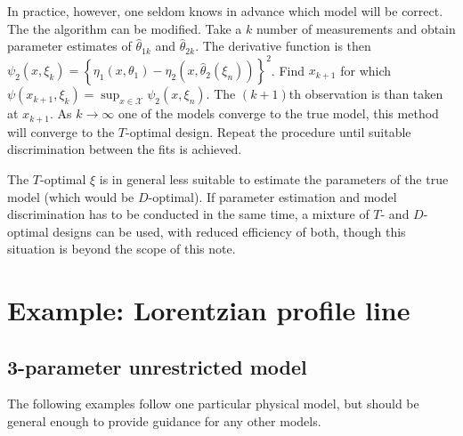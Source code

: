 \documentclass[12pt]{iopart}
\begin{document}
In practice, however, one seldom knows in advance which model will be correct. The the algorithm can be modified. Take a $k$ number of measurements and obtain parameter estimates of $\hat \theta_{1k}$ and $\hat \theta_{2k}$. The derivative function is then $\psi_2(x, \xi_k) = \left\{\eta_1(x, \theta_1) - \eta_2(x, \hat \theta_2(\xi_n))\right\}^2$. Find $x_{k+1}$ for which $\psi(x_{k+1}, \xi_k) = \sup_{x \in \mathcal{X}}\psi_2(x, \xi_n)$. The $(k+1)$th observation is than taken at $x_{k+1}$. As $k \rightarrow \infty$ one of the models converge to the true model, this method will converge to the $T$-optimal design. Repeat the procedure until suitable discrimination between the fits is achieved.

The $T$-optimal $\xi$ is in general less suitable to estimate the parameters of the true model (which would be $D$-optimal). If parameter estimation and model discrimination has to be conducted in the same time, a mixture of $T$- and $D$-optimal designs can be used, with reduced efficiency of both, though this situation is beyond the scope of this note.


\section{Example: Lorentzian profile line}
\label{seq:example}

\subsection{3-parameter unrestricted model}
\label{seq:exopt}

The following examples follow one particular physical model, but should be general enough to provide guidance for any other models.
\end{document}

